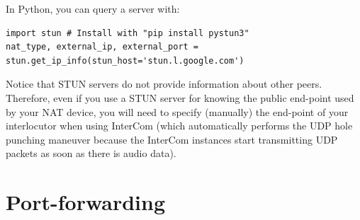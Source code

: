 In Python, you can query a server with:
\begin{verbatim}
import stun # Install with "pip install pystun3"
nat_type, external_ip, external_port = stun.get_ip_info(stun_host='stun.l.google.com')
\end{verbatim}

Notice that STUN servers do not provide information about other
peers. Therefore, even if you use a STUN server for knowing the public
end-point used by your NAT device, you will need to specify (manually)
the end-point of your interlocutor when using InterCom (which
automatically performs the UDP hole punching maneuver because the
InterCom instances start transmitting UDP packets as soon as there is
audio data).

\section{Port-forwarding}

